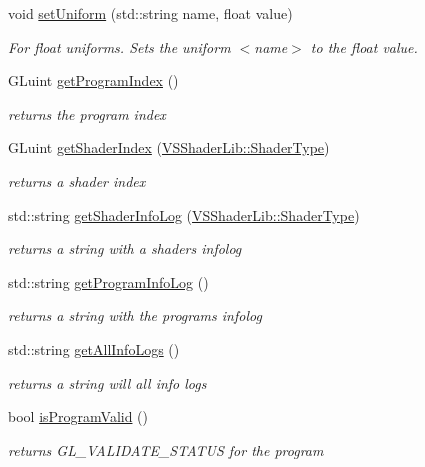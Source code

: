\begin{DoxyCompactItemize}
void \hyperlink{class_v_s_shader_lib_a0ce1b5965910417965d321286ee552b7}{set\+Uniform} (std\+::string name, float value)
\begin{DoxyCompactList}\small\item\em For float uniforms. Sets the uniform $<$name$>$ to the float value. \end{DoxyCompactList}\item 
G\+Luint \hyperlink{class_v_s_shader_lib_af57f630bc05ce6e3144229ae681b9f8d}{get\+Program\+Index} ()
\begin{DoxyCompactList}\small\item\em returns the program index \end{DoxyCompactList}\item 
G\+Luint \hyperlink{class_v_s_shader_lib_a7391982c3a9878a36edf6c433b8ffa06}{get\+Shader\+Index} (\hyperlink{class_v_s_shader_lib_ae8a4410569faa6d4df9760e998a9706a}{V\+S\+Shader\+Lib\+::\+Shader\+Type})
\begin{DoxyCompactList}\small\item\em returns a shader index \end{DoxyCompactList}\item 
std\+::string \hyperlink{class_v_s_shader_lib_a8ea26f77b36ed6c6402738c118c5f8e1}{get\+Shader\+Info\+Log} (\hyperlink{class_v_s_shader_lib_ae8a4410569faa6d4df9760e998a9706a}{V\+S\+Shader\+Lib\+::\+Shader\+Type})
\begin{DoxyCompactList}\small\item\em returns a string with a shader\textquotesingle{}s infolog \end{DoxyCompactList}\item 
std\+::string \hyperlink{class_v_s_shader_lib_a1d201eb508747e8d223d9e2030af274b}{get\+Program\+Info\+Log} ()
\begin{DoxyCompactList}\small\item\em returns a string with the program\textquotesingle{}s infolog \end{DoxyCompactList}\item 
std\+::string \hyperlink{class_v_s_shader_lib_ad3017d7299373b0295ad6ec2cdff93f3}{get\+All\+Info\+Logs} ()
\begin{DoxyCompactList}\small\item\em returns a string will all info logs \end{DoxyCompactList}\item 
bool \hyperlink{class_v_s_shader_lib_a141ac8a185556cdc20615472d1645d79}{is\+Program\+Valid} ()
\begin{DoxyCompactList}\small\item\em returns G\+L\+\_\+\+V\+A\+L\+I\+D\+A\+T\+E\+\_\+\+S\+T\+A\+T\+US for the program \end{DoxyCompactList}\item 

\end{DoxyCompactItemize}
